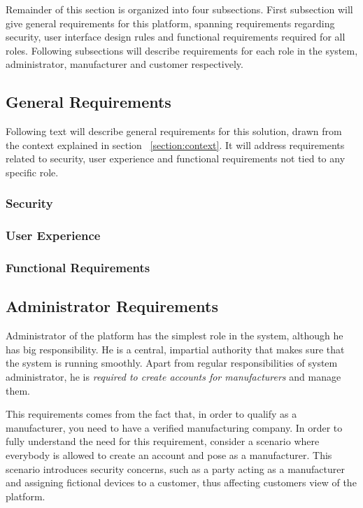 Remainder of this section is organized into four subsections. First subsection will give general requirements for this platform, spanning requirements regarding security, user interface design rules and functional requirements required for all roles. Following subsections will describe requirements for each role in the system, administrator, manufacturer and customer respectively.    

\subsection{General Requirements}

Following text will describe general requirements for this solution, drawn from the context explained in section ~\ref{section:context}. It will address requirements related to security, user experience and functional requirements not tied to any specific role.

\subsubsection{Security}


\subsubsection{User Experience}

\subsubsection{Functional Requirements}

\subsection{Administrator Requirements}

Administrator of the platform has the simplest role in the system, although he has big responsibility. He is a central, impartial authority that makes sure that the system is running smoothly. Apart from regular responsibilities of system administrator, he is \emph{required to create accounts for manufacturers} and manage them. 

This requirements comes from the fact that, in order to qualify as a manufacturer, you need to have a verified manufacturing company. In order to fully understand the need for this requirement, consider a scenario where everybody is allowed to create an account and pose as a manufacturer. This scenario introduces security concerns, such as a party acting as a manufacturer and assigning fictional devices to a customer, thus affecting customers view of the platform.

